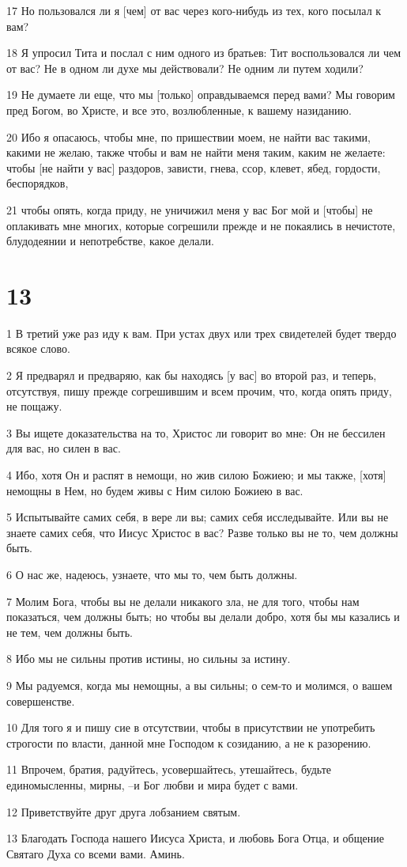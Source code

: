 \par 17 Но пользовался ли я [чем] от вас через кого-нибудь из тех, кого посылал к вам?
\par 18 Я упросил Тита и послал с ним одного из братьев: Тит воспользовался ли чем от вас? Не в одном ли духе мы действовали? Не одним ли путем ходили?
\par 19 Не думаете ли еще, что мы [только] оправдываемся перед вами? Мы говорим пред Богом, во Христе, и все это, возлюбленные, к вашему назиданию.
\par 20 Ибо я опасаюсь, чтобы мне, по пришествии моем, не найти вас такими, какими не желаю, также чтобы и вам не найти меня таким, каким не желаете: чтобы [не найти у вас] раздоров, зависти, гнева, ссор, клевет, ябед, гордости, беспорядков,
\par 21 чтобы опять, когда приду, не уничижил меня у вас Бог мой и [чтобы] не оплакивать мне многих, которые согрешили прежде и не покаялись в нечистоте, блудодеянии и непотребстве, какое делали.

\chapter{13}

\par 1 В третий уже раз иду к вам. При устах двух или трех свидетелей будет твердо всякое слово.
\par 2 Я предварял и предваряю, как бы находясь [у вас] во второй раз, и теперь, отсутствуя, пишу прежде согрешившим и всем прочим, что, когда опять приду, не пощажу.
\par 3 Вы ищете доказательства на то, Христос ли говорит во мне: Он не бессилен для вас, но силен в вас.
\par 4 Ибо, хотя Он и распят в немощи, но жив силою Божиею; и мы также, [хотя] немощны в Нем, но будем живы с Ним силою Божиею в вас.
\par 5 Испытывайте самих себя, в вере ли вы; самих себя исследывайте. Или вы не знаете самих себя, что Иисус Христос в вас? Разве только вы не то, чем должны быть.
\par 6 О нас же, надеюсь, узнаете, что мы то, чем быть должны.
\par 7 Молим Бога, чтобы вы не делали никакого зла, не для того, чтобы нам показаться, чем должны быть; но чтобы вы делали добро, хотя бы мы казались и не тем, чем должны быть.
\par 8 Ибо мы не сильны против истины, но сильны за истину.
\par 9 Мы радуемся, когда мы немощны, а вы сильны; о сем-то и молимся, о вашем совершенстве.
\par 10 Для того я и пишу сие в отсутствии, чтобы в присутствии не употребить строгости по власти, данной мне Господом к созиданию, а не к разорению.
\par 11 Впрочем, братия, радуйтесь, усовершайтесь, утешайтесь, будьте единомысленны, мирны, --и Бог любви и мира будет с вами.
\par 12 Приветствуйте друг друга лобзанием святым.
\par 13 Благодать Господа нашего Иисуса Христа, и любовь Бога Отца, и общение Святаго Духа со всеми вами. Аминь.


